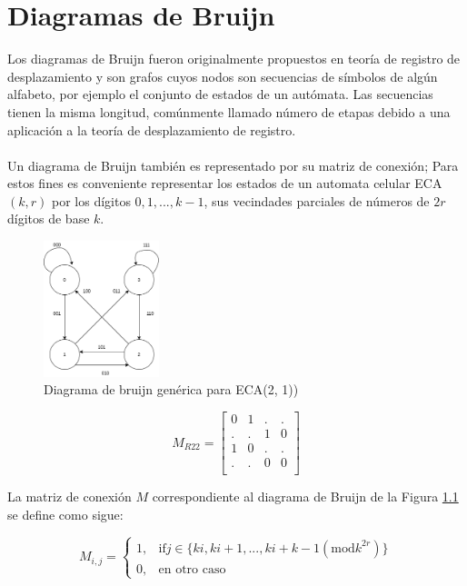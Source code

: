 \chapter{Diagramas de Bruijn}
Los diagramas de Bruijn fueron originalmente propuestos en teoría de registro de desplazamiento \cite{mcintosh1} y son grafos cuyos nodos son secuencias de símbolos de algún alfabeto, por ejemplo el conjunto de estados de un autómata. Las secuencias tienen la misma longitud, comúnmente llamado número de etapas debido a una aplicación a la teoría de desplazamiento de registro.\\\\

Un diagrama de Bruijn también es representado por su matriz de conexión; Para estos fines es conveniente representar los estados de un automata celular ECA$(k, r)$ por los dígitos \textbf{$0,1,...,k-1$}, sus vecindades parciales de números de $2r$ dígitos de base $k$.\cite{regularLanguage}


\begin{figure}[h]
	\centering
	\includegraphics[width=0.3\textwidth]{capitulo1/images/brujin.png}
	\caption{Diagrama de bruijn genérica para ECA(2, 1))}
	\label{fig:bruijn}
\end{figure}
\newpage

\begin{equation}
	M_{R22}=
	\begin{bmatrix}
	0 & 1 & . & .\\
	. & . &  1 & 0\\
	1 & 0 &  . & .\\
	. & . &  0 & 0\\
	\end{bmatrix}
\end{equation}

La matriz de conexión $M$ correspondiente al diagrama de Bruijn de la Figura \ref{fig:bruijn} se define como sigue:

\begin{center}
	\begin{equation}
		 M_{i,j} = 
		\begin{cases}
			1, & \text{if} j \in \{ki, ki+1,...,ki+k-1 (\text{mod} k^{2r})\}\\
			0, & \text{en otro caso}
			
		\end{cases}
	\end{equation}
\end{center}

